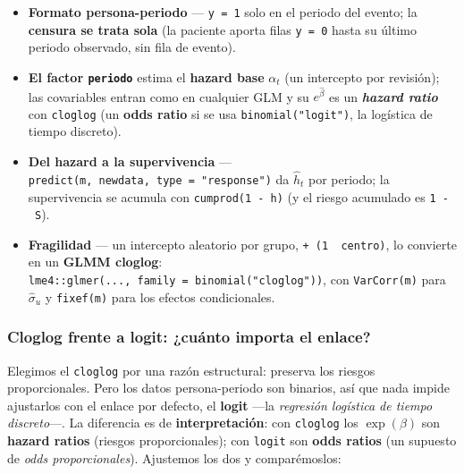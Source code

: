 \documentclass[
  letterpaper,
  DIV=11,
  numbers=noendperiod]{scrartcl}
\providecommand{\tightlist}{%
  \setlength{\itemsep}{0pt}\setlength{\parskip}{0pt}}\usepackage{longtable,booktabs,array}
\begin{document}
\begin{tcolorbox}
\begin{itemize}
\tightlist
\item
  \textbf{Formato persona-periodo} --- \texttt{y\ =\ 1} solo en el
  periodo del evento; la \textbf{censura se trata sola} (la paciente
  aporta filas \texttt{y\ =\ 0} hasta su último periodo observado, sin
  fila de evento).
\item
  \textbf{El factor \texttt{periodo}} estima el \textbf{hazard base}
  \(\alpha_t\) (un intercepto por revisión); las covariables entran como
  en cualquier GLM y su \(e^{\hat\beta}\) es un \textbf{\emph{hazard
  ratio}} con \texttt{cloglog} (un \textbf{odds ratio} si se usa
  \texttt{binomial("logit")}, la logística de tiempo discreto).
\item
  \textbf{Del hazard a la supervivencia} ---
  \texttt{predict(m,\ newdata,\ type\ =\ "response")} da \(\hat h_t\)
  por periodo; la supervivencia se acumula con \texttt{cumprod(1\ -\ h)}
  (y el riesgo acumulado es \texttt{1\ -\ S}).
\item
  \textbf{Fragilidad} --- un intercepto aleatorio por grupo,
  \texttt{+\ (1\ \textbar{}\ centro)}, lo convierte en un \textbf{GLMM
  cloglog}: \texttt{lme4::glmer(...,\ family\ =\ binomial("cloglog"))},
  con \texttt{VarCorr(m)} para \(\hat\sigma_u\) y \texttt{fixef(m)} para
  los efectos condicionales.
\end{itemize}

\end{tcolorbox}

\hypertarget{sec-u15-logit}{%
\subsubsection{Cloglog frente a logit: ¿cuánto importa el
enlace?}\label{sec-u15-logit}}

Elegimos el \texttt{cloglog} por una razón estructural: preserva los
riesgos proporcionales. Pero los datos persona-periodo son binarios, así
que nada impide ajustarlos con el enlace por defecto, el \textbf{logit}
---la \emph{regresión logística de tiempo discreto}---. La diferencia es
de \textbf{interpretación}: con \texttt{cloglog} los \(\exp(\beta)\) son
\textbf{hazard ratios} (riesgos proporcionales); con \texttt{logit} son
\textbf{odds ratios} (un supuesto de \emph{odds proporcionales}).
Ajustemos los dos y comparémoslos:
\end{document}
